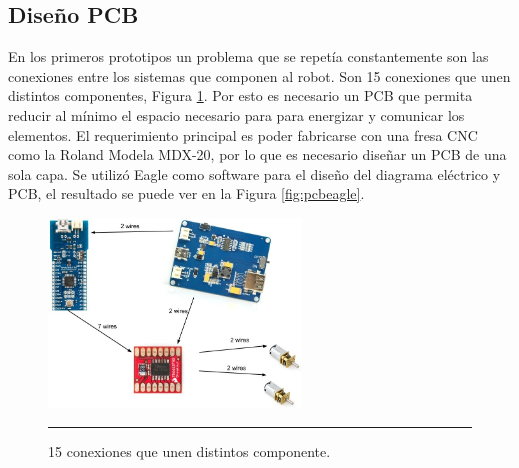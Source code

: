 \subsection{Diseño PCB}

En los primeros prototipos un problema que se repetía constantemente son las conexiones entre los sistemas que componen al robot. Son 15 conexiones que unen distintos componentes, Figura \ref{fig:Diagrama cables}. Por esto es necesario un PCB que permita reducir al mínimo el espacio necesario para para energizar y comunicar los elementos. El requerimiento principal es poder fabricarse con una fresa CNC como la Roland Modela MDX-20, por lo que es necesario diseñar un PCB de una sola capa. Se utilizó Eagle como software para el diseño del diagrama eléctrico y PCB, el resultado se puede ver en la Figura \ref{fig:pcbeagle}.


\begin{figure}[htbp]
	\centering
		\includegraphics[width=0.6\textwidth]{./Figures/Diagrama.jpg}
		\rule{35em}{0.5pt}
	\caption[cables]{15 conexiones que unen distintos componente.}
	\label{fig:Diagrama cables}
\end{figure}	


